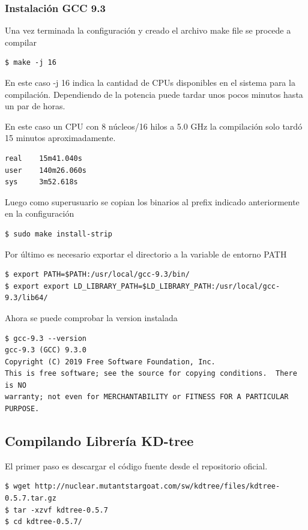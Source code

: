 \documentclass[12pt]{article}
\begin{document}
\subsubsection{Instalación GCC 9.3}

Una vez terminada la configuración y creado el archivo make file se procede a compilar

\begin{lstlisting}[frame=single]
$ make -j 16
\end{lstlisting}
En este caso -j 16 indica la cantidad de CPUs disponibles en el sistema para la compilación. Dependiendo de la potencia puede tardar unos pocos minutos hasta un par de horas.

En este caso un CPU con 8 núcleos/16 hilos a 5.0 GHz la compilación solo tardó 15 minutos aproximadamente. 

\begin{lstlisting}[frame=single]
real    15m41.040s
user    140m26.060s
sys     3m52.618s
\end{lstlisting}

Luego como superusuario se copian los binarios al prefix indicado anteriormente en la configuración
\begin{lstlisting}[frame=single]
$ sudo make install-strip
\end{lstlisting}

Por último es necesario exportar el directorio a la variable de entorno PATH
\begin{lstlisting}[frame=single]
$ export PATH=$PATH:/usr/local/gcc-9.3/bin/
$ export export LD_LIBRARY_PATH=$LD_LIBRARY_PATH:/usr/local/gcc-9.3/lib64/
\end{lstlisting}

Ahora se puede comprobar la version instalada
\begin{lstlisting}[frame=single]
$ gcc-9.3 --version
gcc-9.3 (GCC) 9.3.0
Copyright (C) 2019 Free Software Foundation, Inc.
This is free software; see the source for copying conditions.  There is NO
warranty; not even for MERCHANTABILITY or FITNESS FOR A PARTICULAR PURPOSE.
\end{lstlisting}

\subsection{Compilando Librería KD-tree}

El primer paso es descargar el código fuente desde el repositorio oficial.
\begin{lstlisting}[frame=single]
$ wget http://nuclear.mutantstargoat.com/sw/kdtree/files/kdtree-0.5.7.tar.gz
$ tar -xzvf kdtree-0.5.7
$ cd kdtree-0.5.7/
\end{lstlisting}
\end{document}
